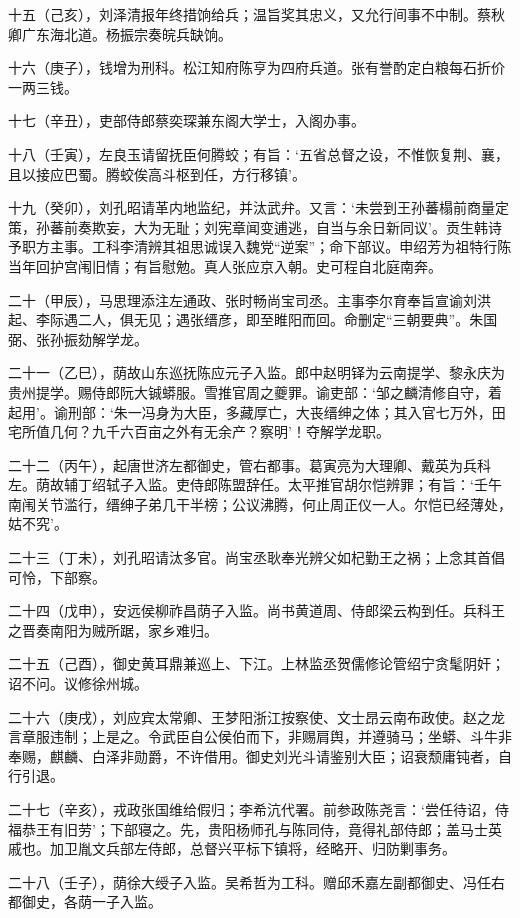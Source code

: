 \documentclass[]{article}
\begin{document}
十五（己亥），刘泽清报年终措饷给兵；温旨奖其忠义，又允行间事不中制。蔡秋卿广东海北道。杨振宗奏皖兵缺饷。

十六（庚子），钱增为刑科。松江知府陈亨为四府兵道。张有誉酌定白粮每石折价一两三钱。

十七（辛丑），吏部侍郎蔡奕琛兼东阁大学士，入阁办事。

十八（壬寅），左良玉请留抚臣何腾蛟；有旨：`五省总督之设，不惟恢复荆、襄，且以接应巴蜀。腾蛟俟高斗枢到任，方行移镇'。

十九（癸卯），刘孔昭请革内地监纪，并汰武弁。又言：`未尝到王孙蕃榻前商量定策，孙蕃前奏欺妄，大为无耻；刘宪章闻变逋逃，自当与余日新同议'。贡生韩诗予职方主事。工科李清辨其祖思诚误入魏党``逆案''；命下部议。申绍芳为祖特行陈当年回护宫闱旧情；有旨慰勉。真人张应京入朝。史可程自北庭南奔。

二十（甲辰），马思理添注左通政、张时畅尚宝司丞。主事李尔育奉旨宣谕刘洪起、李际遇二人，俱无见；遇张缙彦，即至睢阳而回。命删定``三朝要典''。朱国弼、张孙振劾解学龙。

二十一（乙巳），荫故山东巡抚陈应元子入监。郎中赵明铎为云南提学、黎永庆为贵州提学。赐侍郎阮大铖蟒服。雪推官周之夔罪。谕吏部：`邹之麟清修自守，着起用'。谕刑部：`朱一冯身为大臣，多藏厚亡，大丧缙绅之体；其入官七万外，田宅所值几何？九千六百亩之外有无余产？察明'！夺解学龙职。

二十二（丙午），起唐世济左都御史，管右都事。葛寅亮为大理卿、戴英为兵科左。荫故辅丁绍轼子入监。吏侍郎陈盟辞任。太平推官胡尔恺辨罪；有旨：`壬午南闱关节滥行，缙绅子弟几干半榜；公议沸腾，何止周正仪一人。尔恺已经薄处，姑不究'。

二十三（丁未），刘孔昭请汰多官。尚宝丞耿奉光辨父如杞勤王之祸；上念其首倡可怜，下部察。

二十四（戊申），安远侯柳祚昌荫子入监。尚书黄道周、侍郎梁云构到任。兵科王之晋奏南阳为贼所踞，家乡难归。

二十五（己酉），御史黄耳鼎兼巡上、下江。上林监丞贺儒修论管绍宁贪髦阴奸；诏不问。议修徐州城。

二十六（庚戌），刘应宾太常卿、王梦阳浙江按察使、文士昂云南布政使。赵之龙言章服违制；上是之。令武臣自公侯伯而下，非赐肩舆，并遵骑马；坐蟒、斗牛非奉赐，麒麟、白泽非勋爵，不许借用。御史刘光斗请鉴别大臣；诏衰颓庸钝者，自行引退。

二十七（辛亥），戎政张国维给假归；李希沆代署。前参政陈尧言：`尝任待诏，侍福恭王有旧劳'；下部寝之。先，贵阳杨师孔与陈同侍，竟得礼部侍郎；盖马士英戚也。加卫胤文兵部左侍郎，总督兴平标下镇将，经略开、归防剿事务。

二十八（壬子），荫徐大绶子入监。吴希哲为工科。赠邱禾嘉左副都御史、冯任右都御史，各荫一子入监。
\end{document}
